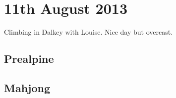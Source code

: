 \documentclass[11pt,a4paper]{report}
\begin{document}
\section*{11th August 2013}

Climbing in Dalkey with Louise. Nice day but overcast.

\subsection*{Prealpine}

\subsection*{Mahjong}
\end{document}
